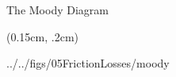 \documentclass[9pt,xcolor=x11names,professionalfonts, mathserif]{beamer}
\begin{document}
\begin{frame}
											      								
											      								\end{frame}
											      								
											      								
											      								\begin{frame}{The Moody Diagram}
											      									\begin{textblock*}{1\columnwidth}(0.15cm, .2cm)
											      										\begin{cfig}[0.6]{../../figs/05FrictionLosses/moody}\end{cfig}
											      									\end{textblock*}
											      								\end{frame}
											      								
\end{document}
